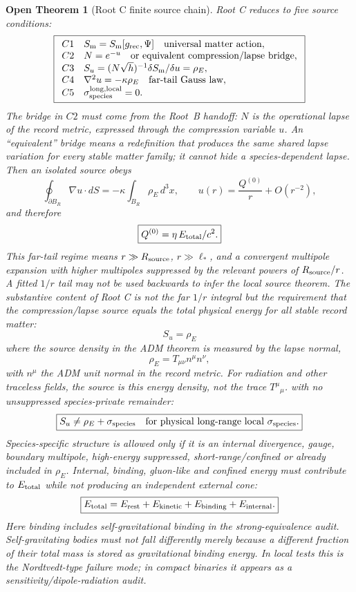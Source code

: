 \documentclass[11pt]{article}
\newtheorem{openthm}{Open Theorem}
\begin{document}
\begin{openthm}[Root C finite source chain]
Root C reduces to five source conditions:
\[
\boxed{
\begin{array}{ll}
C1 & S_{\rm m}=S_{\rm m}[g_{\rm rec},\Psi]\quad\text{universal matter action},\\
C2 & N=e^{-u}\quad\text{or equivalent compression/lapse bridge},\\
C3 & S_u=(N\sqrt h)^{-1}\delta S_{\rm m}/\delta u=\rho_E,\\
C4 & \nabla^2u=-\kappa\rho_E\quad\text{far-tail Gauss law},\\
C5 & \sigma_{\rm species}^{\rm long,local}=0.
\end{array}
}
\]
The bridge in \(C2\) must come from the Root~B handoff: \(N\) is the
operational lapse of the record metric, expressed through the compression
variable \(u\).  An ``equivalent'' bridge means a redefinition that produces
the same shared lapse variation for every stable matter family; it cannot hide
a species-dependent lapse.
Then an isolated source obeys
\[
\boxed{
\oint_{\partial B_R}\nabla u\cdot dS
=
-\kappa\int_{B_R}\rho_E\,d^3x,
\qquad
u(r)=\frac{Q^{(0)}}{r}+O(r^{-2}),
}
\]
and therefore
\[
\boxed{
Q^{(0)}=\eta\,E_{\rm total}/c^2.
}
\]
This far-tail regime means \(r\gg R_{\rm source}\), \(r\gg\ell_*\), and a
convergent multipole expansion with higher multipoles suppressed by the
relevant powers of \(R_{\rm source}/r\).  A fitted \(1/r\) tail may not be used
backwards to infer the local source theorem.
The substantive content of Root C is not the far \(1/r\) integral but the
requirement that the compression/lapse source equals the total physical energy
for all stable record matter:
\[
\boxed{
S_u=\rho_E
}
\]
where the source density in the ADM theorem is measured by the lapse normal,
\[
\boxed{
\rho_E=T_{\mu\nu}n^\mu n^\nu,
}
\]
with \(n^\mu\) the ADM unit normal in the record metric.  For radiation and
other traceless fields, the source is this energy density, not the trace
\(T^\mu{}_\mu\).
with no unsuppressed species-private remainder:
\[
\boxed{
S_u\neq\rho_E+\sigma_{\rm species}
\quad
\text{for physical long-range local }\sigma_{\rm species}.
}
\]
Species-specific structure is allowed only if it is an internal divergence,
gauge, boundary multipole, high-energy suppressed, short-range/confined or
already included in \(\rho_E\).  Internal, binding, gluon-like and confined
energy must contribute to \(E_{\rm total}\) while not producing an independent
external cone:
\[
\boxed{
E_{\rm total}
=
E_{\rm rest}+E_{\rm kinetic}+E_{\rm binding}+E_{\rm internal}.
}
\]
Here binding includes self-gravitational binding in the strong-equivalence
audit.  Self-gravitating bodies must not fall differently merely because a
different fraction of their total mass is stored as gravitational binding
energy.  In local tests this is the Nordtvedt-type failure mode; in compact
binaries it appears as a sensitivity/dipole-radiation audit.


\end{openthm}
\end{document}
